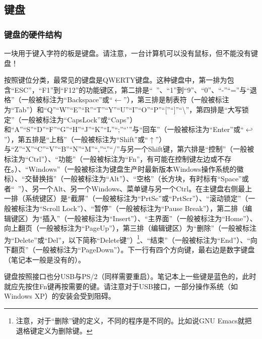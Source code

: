 \subsection{键盘}
\subsubsection{键盘的硬件结构}
一块用于键入字符的板是键盘。请注意，一台计算机可以没有鼠标，但不能没有键盘！\par
按照键位分类，最常见的键盘是QWERTY键盘。这种键盘中，第一排为包含“ESC”，“F1”到“F12”的功能键区，第二排是“~”、“1”到“9”、“0”、“-”“=”与“退格”（一般被标注为“Backspace”或“$\leftarrow$”），第三排是制表符（一般被标注为“Tab”）和“Q”“W”“E”“R”“T”“Y”“U”“I”“O”“P”“[”“]”“\textbackslash”，第四排是“大写锁定”（一般被标注为“CapsLock”或“Caps”）和“A”“S”“D”“F”“G”“H”“J”“K”“L”“;”“'”与“回车”（一般被标注为“Enter”或“$\hookleftarrow$”），第五排是“上档”（一般被标注为“Shift”或“$\uparrow$”）与“Z”“X”“C”“V”“B”“N”“M”“,”“.”“/”与另一个Shift键，第六排是“控制”（一般被标注为“Ctrl”）、“功能”（一般被标注为“Fn”，有可能在控制键左边或不存在。）、“Windows”（一般被标注为键盘生产时最新版本Windows操作系统的徽标）、“交替换挡”（一般被标注为“Alt”）、“空格”（长方块，有时标有“Space”或者“\verb*| |”）、另一个Alt、另一个Windows、菜单键与另一个Ctrl。在主键盘右侧最上一排（系统键区）是“截屏”（一般被标注为“PrtSc”或“PrtScr”）、“滚动锁定”（一般被标注为“Scroll Lock”）、“暂停”（一般被标注为“Pause Break”），第二排（编辑键区）为“插入”（一般被标注为“Insert”）、“主界面”（一般被标注为“Home”）、向上翻页（一般被标注为“PageUp”），第三排（编辑键区）为“删除”（一般被标注为“Delete”或“Del”，以下简称“Delete键”）\footnote{注意，对于“删除”键的定义，不同的程序是不同的。比如说GNU Emacs就把退格键定义为删除键。}、“结束”（一般被标注为“End”）、“向下翻页”（一般被标注为“PageDown”）。下一行有四个方向键，最右边是数字键盘（笔记本一般是没有的）。\par
键盘按照接口也分USB与PS/2（同样需要重启）。笔记本上一些键是蓝色的，此时就应先按住Fn键再按需要的键。请注意对于USB接口，一部分操作系统（如Windows XP）的安装会受到阻碍。
